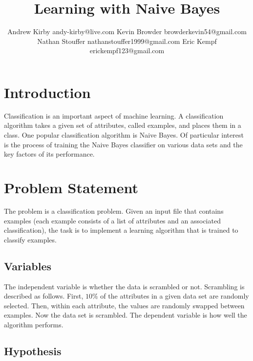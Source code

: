 \documentclass[twoside,11pt]{article}
\begin{document}
\title{Learning with Naive Bayes}

\author{\name Andrew Kirby \email andy-kirby@live.com \AND
		\name Kevin Browder \email browderkevin54@gmail.com \AND
		\name Nathan Stouffer \email nathanstouffer1999@gmail.com \AND
		\name Eric Kempf \email erickempf123@gmail.com }
	
\maketitle

\begin{abstract}
	
\end{abstract}

\section{Introduction}

Classification is an important aspect of machine learning. A classification algorithm takes a given set of attributes, called examples, and places them in a class. One popular classification algorithm is Naive Bayes. Of particular interest is the process of training the Naive Bayes classifier on various data sets and the key factors of its performance.

\section{Problem Statement}

The problem is a classification problem. Given an input file that contains examples (each example consists of a list of attributes and an associated classification), the task is to implement a learning algorithm that is trained to classify examples.

\subsection{Variables}

The independent variable is whether the data is scrambled or not. Scrambling is described as follows. First, $10\%$ of the attributes in a given data set are randomly selected. Then, within each attribute, the values are randomly swapped between examples. Now the data set is scrambled. The dependent variable is how well the algorithm performs.

\subsection{Hypothesis}
\end{document}
